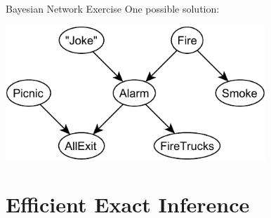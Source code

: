 \documentclass[12pt]{beamer}
\begin{document}
\begin{frame}{Bayesian Network Exercise}
	One possible solution:
	\begin{center}
		\includegraphics[height=2in]{fire_alarm}
	\end{center}
\end{frame}


\section{Efficient Exact Inference}
\end{document}
